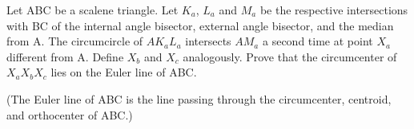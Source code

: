 Let ABC be a scalene triangle. Let $K_a$, $L_a$ and $M_a$ be the respective intersections with BC of the internal angle bisector, external angle bisector, and the median from A. The circumcircle of $AK_aL_a$ intersects $AM_a$ a second time at point $X_a$ different from A. Define $X_b$ and $X_c$ analogously. Prove that the circumcenter of $X_aX_bX_c$ lies on the Euler line of ABC.

(The Euler line of ABC is the line passing through the circumcenter, centroid, and orthocenter of ABC.)